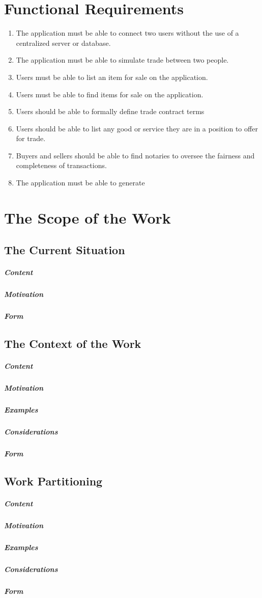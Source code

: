 \documentclass{article}
\begin{document}
\section*{Functional Requirements}
\begin{enumerate}
\item
The application must be able to connect two users without the use of a centralized server or database.

\item
The application must be able to simulate trade between two people.

\item
Users must be able to list an item for sale on the application.

\item
Users must be able to find items for sale on the application.

\item
Users should be able to formally define trade contract terms

\item
Users should be able to list any good or service they are in a position to offer for trade.

\item
Buyers and sellers should be able to find notaries to oversee the fairness and completeness of transactions.

\item
The application must be able to generate 
\end{enumerate}
\section{The Scope of the Work}
\subsection{The Current Situation}
\subparagraph{Content}
\subparagraph{Motivation}
\subparagraph{Form}

\subsection{The Context of the Work}
\subparagraph{Content}
\subparagraph{Motivation}
\subparagraph{Examples}
\subparagraph{Considerations}
\subparagraph{Form}

\subsection{Work Partitioning}
\subparagraph{Content}
\subparagraph{Motivation}
\subparagraph{Examples}
\subparagraph{Considerations}
\subparagraph{Form}
\end{document}
